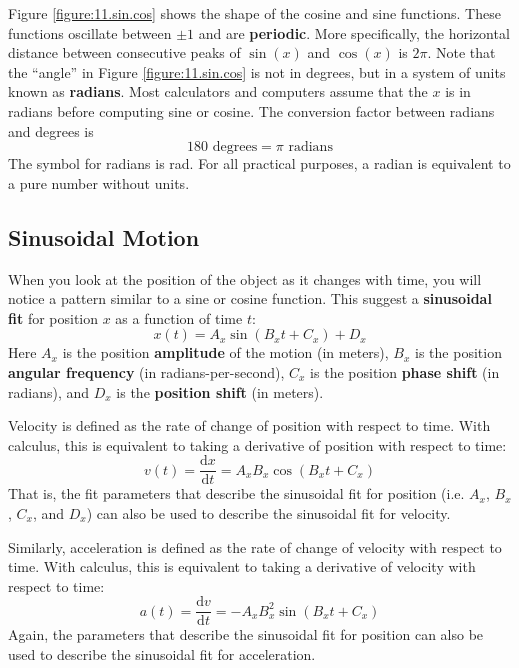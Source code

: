 Figure \ref{figure:11.sin.cos} shows the shape of the cosine and sine functions. These functions oscillate between $\pm 1$ and are \textbf{periodic}. More specifically, the horizontal distance between consecutive peaks of $\sin(x)$ and $\cos(x)$ is $2\pi$. Note that the ``angle'' in Figure \ref{figure:11.sin.cos} is not in degrees, but in a system of units known as \textbf{radians}. Most calculators and computers assume that the $x$ is in radians before computing sine or cosine. The conversion factor between radians and degrees is
\begin{equation}
    180 \text{ degrees} = \pi \text{ radians}
\end{equation}
The symbol for radians is rad. For all practical purposes, a radian is equivalent to a pure number without units.
\subsection{Sinusoidal Motion}
When you look at the position of the object as it changes with time, you will notice a pattern similar to a sine or cosine function. This suggest a \textbf{sinusoidal fit} for position $x$ as a function of time $t$:
\begin{equation}
    x(t) = A_{x} \sin\left( B_{x}t + C_{x} \right) + D_{x}
\end{equation}
Here $A_{x}$ is the position \textbf{amplitude} of the motion (in meters), $B_{x}$ is the position \textbf{angular frequency} (in radians-per-second), $C_{x}$ is the position \textbf{phase shift} (in radians), and $D_{x}$ is the \textbf{position shift} (in meters).

Velocity is defined as the rate of change of position with respect to time. With calculus, this is equivalent to taking a derivative of position with respect to time:
\begin{equation}
    v(t) = \frac{\mathrm{d} x}{\mathrm{d} t} = A_{x}B_{x} \cos\left( B_{x}t + C_{x} \right)
    \label{eq.11.v}
\end{equation}
That is, the fit parameters that describe the sinusoidal fit for position (i.e. $A_{x}$, $B_{x}$, $C_{x}$, and $D_{x}$) can also be used to describe the sinusoidal fit for velocity.

Similarly, acceleration is defined as the rate of change of velocity with respect to time. With calculus, this is equivalent to taking a derivative of velocity with respect to time:
\begin{equation}
    a(t) = \frac{\mathrm{d} v}{\mathrm{d} t} = -A_{x}B^{2}_{x} \sin\left( B_{x}t + C_{x} \right)
    \label{eq.11.a}
\end{equation}
Again, the parameters that describe the sinusoidal fit for position can also be used to describe the sinusoidal fit for acceleration.

